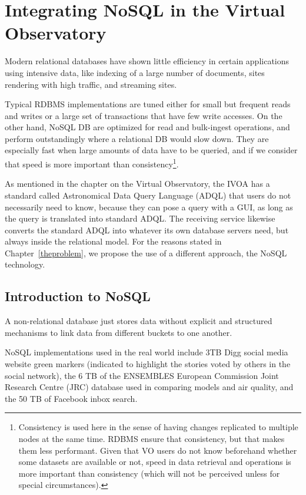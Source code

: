 \chapter{Integrating NoSQL in the Virtual Observatory} %
\label{cha:integrating_nosql_in_the_virtual_observatory}

Modern relational databases have shown little efficiency in certain applications using intensive data, like indexing of a large number of documents, sites rendering with high traffic, and streaming sites.

Typical RDBMS implementations are tuned either for small but frequent reads and writes or a large set of transactions that have few write accesses. On the other hand, NoSQL DB are optimized for read and bulk-ingest operations, and perform outstandingly where a relational DB would slow down. They are especially fast when large amounts of data have to be queried, and if we consider that speed is more important than consistency\footnote{Consistency is used here in the sense of having changes replicated to multiple nodes at the same time. RDBMS ensure that consistency, but that makes them less performant. Given that VO users do not know beforehand whether some datasets are available or not, speed in data retrieval and operations is more important than consistency (which will not be perceived unless for special circumstances).}.

As mentioned in the chapter on the Virtual Observatory, the
IVOA has a standard called Astronomical Data Query Language (ADQL) that users do not necessarily need to know, because
they %
can pose a query with a GUI, as long as the query is translated into standard ADQL. The receiving service likewise converts the standard ADQL into whatever its own database servers need, but always inside
the
relational model. For the reasons stated in Chapter~\ref{theproblem}, we propose the use of a different approach, the NoSQL technology.


\section{Introduction to NoSQL} %
\label{sec:nosql}

A non-relational database just stores data without explicit and structured mechanisms to link data from different buckets to one another.

NoSQL implementations used in the real world include 3TB Digg
social media website
green markers (indicated to highlight the stories voted by others in the social network), the 6 TB of
the ENSEMBLES
European Commission
Joint Research Centre (JRC)
database used in comparing models and air quality, and the 50 TB of Facebook inbox search. 

